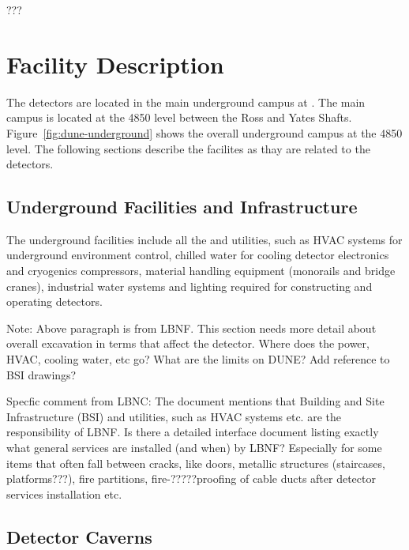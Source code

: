 ???\chapter{Facility Description}
\label{vl:tc-facility}

The  detectors are located in the main underground campus at . The main campus is located at the 4850 level between the Ross and Yates Shafts. Figure~\ref{fig:dune-underground} shows the overall underground campus at the  4850 level. The following sections describe the facilites as thay are related to the  detectors.

\section{Underground Facilities and Infrastructure}
\label{sec:fdsp-coord-uderground-excavation}

The underground facilities include all the  and utilities,
such as HVAC systems for underground environment control, chilled
water for cooling detector electronics and cryogenics compressors,
material handling equipment (monorails and bridge cranes), industrial
water systems and lighting required for constructing and operating
detectors.

Note: Above paragraph is from LBNF. This section needs more detail about overall excavation in terms that affect the detector. Where
does the power, HVAC, cooling water, etc go? What are the limits on DUNE? Add reference to BSI drawings?

Specfic comment from LBNC:
The document mentions that Building and Site Infrastructure (BSI) and utilities, such as HVAC systems etc. are the responsibility of LBNF. Is there a 
detailed interface document listing exactly what general services are installed (and when) by LBNF? Especially for some items that often fall between cracks, like doors, metallic structures (staircases, platforms???), fire partitions, fire-?????proofing of cable ducts after detector services installation etc. 



\section{Detector Caverns}
\label{sec:fdsp-coord-faci-caverns}


